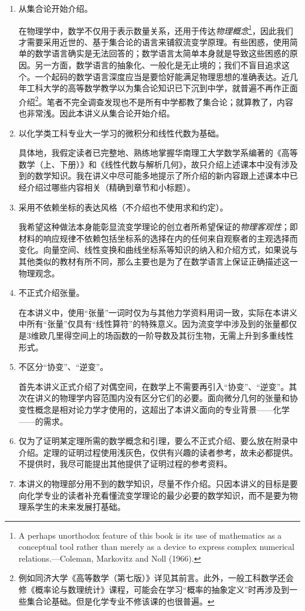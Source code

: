 \documentclass[main.tex]{subfiles}
\begin{document}
\begin{enumerate}
      \item 从集合论开始介绍。

            在物理学中，数学不仅用于表示数量关系，还用于传达\emph{物理概念}\footnote{A perhaps unorthodox feature of this book is its use of mathematics as a conceptual tool rather than merely as a device to express complex numerical relations.---Coleman, Markovitz and Noll (1966)\cite{Coleman1966}.}，因此我们才需要采用近世的、基于集合论的语言来铺叙流变学原理。有些困惑，使用简单的数学语言确实是无法回答的；数学语言太简单本身就是导致这些困惑的原因。另一方面，数学语言的抽象化、一般化是无止境的；我们不盲目追求这个。一个起码的数学语言深度应当是要恰好能满足物理思想的准确表达。近几年工科大学的高等数学教学以为集合论知识已下沉到中学，就普遍不再作正面介绍\footnote{例如同济大学《高等数学（第七版）》详见其前言。此外，一般工科数学还会修《概率论与数理统计》课程，可能会在学习“概率的抽象定义”时再涉及到一些集合论基础。但是化学专业不修该课的也很普遍。}。笔者不完全调查发现也不是所有中学都教了集合论；就算教了，内容也非常浅。因此本讲义从集合论开始介绍。
      \item 以化学类工科专业大一学习的微积分和线性代数为基础。

            具体地，我假定读者已完整地、熟练地掌握华南理工大学数学系编著的《高等数学（上、下册）》和《线性代数与解析几何》，故只介绍上述课本中没有涉及到的数学知识。我在讲义中尽可能多地提示了所介绍的新内容跟上述课本中已经介绍过哪些内容相关（精确到章节和小标题）。
      \item 采用不依赖坐标的表达风格（不介绍也不使用求和约定）。

            我希望这种做法本身能彰显流变学理论的创立者所希望保证的\emph{物理客观性}；即材料的响应规律不依赖包括坐标系的选择在内的任何来自观察者的主观选择而变化。向量空间、线性变换和曲线坐标系等知识的纳入和介绍方式，如果说与其他类似的教材有所不同，那么主要也是为了在数学语言上保证正确描述这一物理观念。
      \item 不正式介绍张量。

            在本讲义中，使用“张量”一词时仅为与其他力学资料用词一致，实际在本讲义中所有“张量”仅具有“线性算符”的特殊意义。因为流变学中涉及到的张量都仅是3维欧几里得空间上的场函数的一阶导数及其衍生物，无需上升到多重线性形式。
      \item 不区分“协变”、“逆变”。

            首先本讲义正式介绍了对偶空间，在数学上不需要再引入“协变”、“逆变”。其次在讲义的物理学内容范围内没有区分它们的必要。面向微分几何的张量和协变性概念是相对论力学才使用的，这超出了本讲义面向的专业背景——化学——的需求。
      \item 仅为了证明某定理所需的数学概念和引理，要么不正式介绍、要么放在附录中介绍。定理的证明过程使用浅灰色，仅供有兴趣的读者参考，故未必都提供。不提供时，我尽可能提出其他提供了证明过程的参考资料。
      \item 本讲义的物理部分用不到的数学知识，尽量不作介绍。只因本讲义的目标是要向化学专业的读者补充看懂流变学理论的最少必要的数学知识，而不是要为物理系学生的未来发展打基础。
\end{enumerate}
\end{document}
